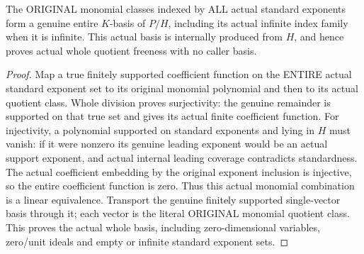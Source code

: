 \begin{theorem}
\label{hir:relative-normal-standard-entire-quotient-basis}
\leanok
{}
The ORIGINAL monomial classes indexed by ALL actual standard exponents form
a genuine entire $K$-basis of $P/H$, including its actual infinite index
family when it is infinite. This actual basis is internally produced from
$H$, and hence proves actual whole quotient freeness with no caller basis.
\end{theorem}
\begin{proof}
Map a true finitely supported coefficient function on the ENTIRE actual
standard exponent set to its original monomial polynomial and then to its
actual quotient class. Whole division proves surjectivity: the genuine
remainder is supported on that true set and gives its actual finite
coefficient function. For injectivity, a polynomial supported on standard
exponents and lying in $H$ must vanish: if it were nonzero its genuine
leading exponent would be an actual support exponent, and actual internal
leading coverage contradicts standardness. The actual coefficient embedding
by the original exponent inclusion is injective, so the entire coefficient
function is zero. Thus this actual monomial combination is a linear
equivalence. Transport the genuine finitely supported single-vector basis
through it; each vector is the literal ORIGINAL monomial quotient class.
This proves the actual whole basis, including zero-dimensional variables,
zero/unit ideals and empty or infinite standard exponent sets.
\end{proof}

